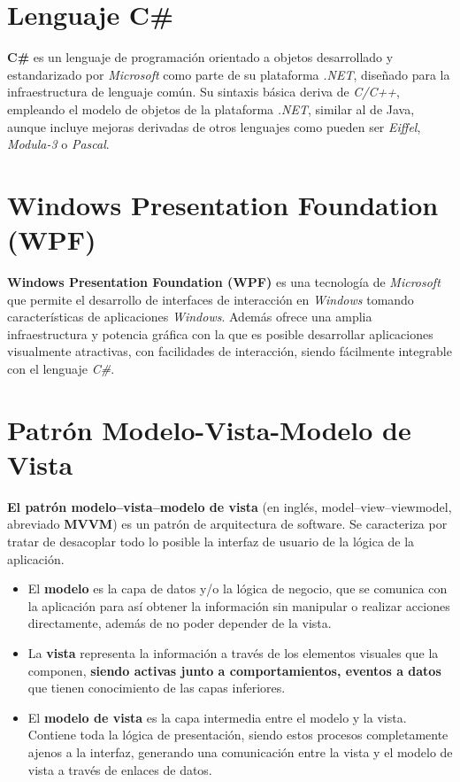 \documentclass[pdftex,11pt,a4paper]{book}
\begin{document}
\section{Lenguaje C\#}
\textbf{C\#} \cite{c_sharp} es un lenguaje de programación orientado a objetos desarrollado y estandarizado por \emph{Microsoft} como parte de su plataforma \emph{.NET}, diseñado para la infraestructura de lenguaje común.
Su sintaxis básica deriva de \emph{C/C++}, empleando el modelo de objetos de la plataforma \emph{.NET}, similar al de Java, aunque incluye mejoras derivadas de otros lenguajes como pueden ser \emph{Eiffel}, \emph{Modula-3} o \textit{Pascal}.

\section{Windows Presentation Foundation (WPF)}

\textbf{Windows Presentation Foundation (WPF)} \cite{wpf} es una tecnología de \emph{Microsoft} que permite el desarrollo de interfaces de interacción en \emph{Windows} tomando características de aplicaciones \emph{Windows}. Además ofrece una amplia infraestructura y potencia gráfica con la que es posible desarrollar aplicaciones visualmente atractivas, con facilidades de interacción, siendo fácilmente integrable con el lenguaje \emph{C\#}.

\section{Patrón Modelo-Vista-Modelo de Vista}
\textbf{El patrón modelo–vista–modelo de vista} \cite{mvvm} (en inglés, model–view–viewmodel, abreviado \textbf{MVVM}) es un patrón de arquitectura de software. Se caracteriza por tratar de desacoplar todo lo posible la interfaz de usuario de la lógica de la aplicación.
\begin{itemize}
\item El \textbf{modelo} es la capa de datos y/o la lógica de negocio, que se comunica con la aplicación para así obtener la información sin manipular  o realizar acciones directamente, además de no poder depender de la vista.

\item La \textbf{vista} representa la información a través de los elementos visuales que la componen, \textbf{siendo activas junto a comportamientos, eventos a datos} que tienen conocimiento de las capas inferiores.

\item El \textbf{modelo de vista} es la capa intermedia entre el modelo y la vista. Contiene toda la lógica de presentación, siendo estos procesos completamente ajenos a la interfaz, generando una comunicación entre la vista y el modelo de vista a través de enlaces de datos.
\end{itemize}
\end{document}
